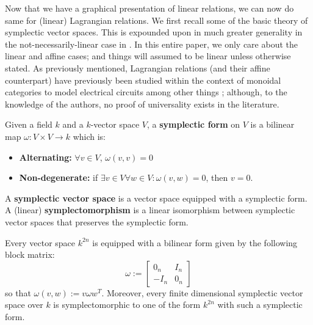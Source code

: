 Now that we have a graphical presentation of linear relations, we can now do same for (linear) Lagrangian relations.  We first recall some of the basic theory of symplectic vector spaces.  This is expounded upon in much greater generality in the not-necessarily-linear case in \cite{weinstein}.  In this entire paper, we only care about the linear and affine cases; and things will assumed to be linear unless otherwise stated.  As previously mentioned, Lagrangian relations (and their affine counterpart) have previously been studied within the context of monoidal categories  to model electrical circuits among other things \cite{passive,network,coya}; although, to the knowledge of the authors, no proof of universality exists in the literature.

\begin{definition}
  Given a field  $k$ and a $k$-vector space $V$, a {\bf symplectic form} on $V$ is a bilinear map $\omega:V\times V\to k$ which is:
\begin{itemize}
 \item {\bf Alternating:} $\forall v \in V$, $\omega(v,v)=0$ \item {\bf Non-degenerate:} if $\exists v \in V \forall w \in V: \omega(v,w)=0$, then $v=0$.
\end{itemize}
  A {\bf symplectic vector space} is a vector space equipped with a symplectic form. A (linear) {\bf symplectomorphism} is a linear isomorphism between symplectic vector spaces that preserves the symplectic form.
\end{definition}


\begin{lemma}
\label{lemma:sform}
Every vector space $k^{2n}$ is equipped with a bilinear form given by the following block matrix:
$$
\omega:=
\begin{bmatrix}
0_n & I_n\\
-I_n & 0_n
\end{bmatrix}
$$
so that $\omega(v,w) := v \omega w^T$.
Moreover, every finite dimensional symplectic vector space over $k$ is symplectomorphic to one of the form $k^{2n}$ with such a symplectic form.
\end{lemma}



%
%
%


